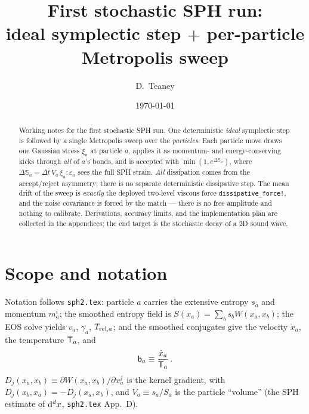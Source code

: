 \documentclass[12pt,aps,preprint,nofootinbib,noshowkeys,noshowpacs,longbibliography,superscriptaddress,tightenlines]{revtex4-2}
\def\Sbb{{\mathbb S}}
\def\bbeta{{\sf b}}
\def\Teff{{\sf T}}
\def\st{\begin{equation}}
\def\stp{\end{equation}}
\def\dd{{\rm d}}
\begin{document}
\title{First stochastic SPH run:\\ideal symplectic step $+$ per-particle Metropolis sweep}
\author{D.~Teaney}
\date{\today}

\begin{abstract}
Working notes for the first stochastic SPH run.  One deterministic \emph{ideal}
symplectic step is followed by a single Metropolis sweep over the
\emph{particles}.  Each particle move draws one Gaussian stress $\xi_a$ at particle
$a$, applies it as momentum- and energy-conserving kicks through \emph{all} of
$a$'s bonds, and is accepted with $\min(1,e^{\Delta\Sbb_a})$, where
$\Delta\Sbb_a = \Delta t\,V_a\,\xi_a\!:\!\varepsilon_a$ sees the full SPH
strain.  \emph{All} dissipation comes from the accept/reject asymmetry; there
is no separate deterministic dissipative step.  The mean drift of the sweep is
\emph{exactly} the deployed two-level viscous force
\texttt{dissipative\_force!}, and the noise covariance is forced by the match
--- there is no free amplitude and nothing to calibrate.  Derivations,
accuracy limits, and the implementation plan are collected in the appendices;
the end target is the stochastic decay of a 2D sound wave.
\end{abstract}

\maketitle
\tableofcontents

\section{Scope and notation}
\label{sec:scope}

Notation follows \texttt{sph2.tex}: particle $a$ carries the extensive entropy
$s_a$ and momentum $m_a^i$; the smoothed entropy field is
$S(x_a)=\sum_b s_b W(x_a,x_b)$; the EOS solve yields $v_a$, $\gamma_a$,
$T_{{\rm rel},a}$; and the smoothed conjugates give the velocity $\dot x_a$,
the temperature $\Teff_a$, and
\st
\bbeta_a \equiv \frac{\dot x_a}{\Teff_a}\,.
\stp
$D_j(x_a,x_b)\equiv\partial W(x_a,x_b)/\partial x_a^j$ is the kernel gradient,
with $D_j(x_b,x_a)=-D_j(x_a,x_b)$, and $V_a\equiv s_a/S_a$ is the particle
``volume'' (the SPH estimate of $\dd^dx$, \texttt{sph2.tex} App.~D).
\end{document}
